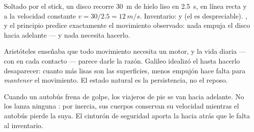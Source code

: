 \begin{example}\label{ex:g10:inertia:puck}
Soltado por el stick, un disco recorre \qty{30}{m} de hielo liso en
\qty{2.5}{s}, en línea recta y a la velocidad constante
$v = 30/2.5 = \qty{12}{m/s}$. Inventario:  y  (el
 es despreciable). , y el principio predice
exactamente el movimiento observado: nada empuja el disco hacia
adelante --- y nada necesita hacerlo.
\end{example}

\begin{remark}
Aristóteles enseñaba que todo movimiento necesita un motor, y la vida
diaria --- con  en cada contacto --- parece darle la razón.
Galileo idealizó el  hasta hacerlo desaparecer: cuanto más
lisas son las superficies, menos empujón hace falta para
\emph{mantener} el movimiento. El estado natural es la persistencia, no
el reposo.
\end{remark}

\begin{remark}
Cuando un autobús frena de golpe, los viajeros de pie se van hacia
adelante. No los lanza ninguna : por inercia, sus cuerpos
conservan su velocidad mientras el autobús pierde la suya. El cinturón
de seguridad aporta la  hacia atrás que le falta al inventario.
\end{remark}


